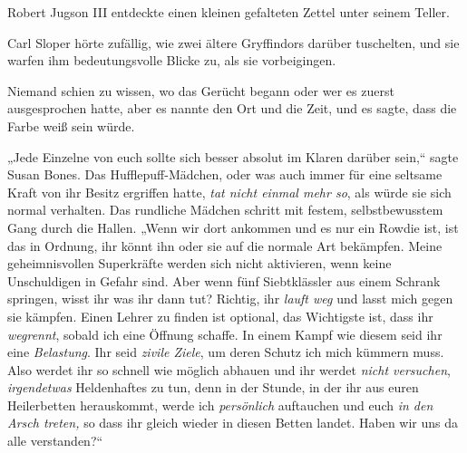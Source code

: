 Robert Jugson III entdeckte einen kleinen gefalteten Zettel unter seinem Teller.

Carl Sloper hörte zufällig, wie zwei ältere Gryffindors darüber tuschelten, und sie warfen ihm bedeutungsvolle Blicke zu, als sie vorbeigingen.

Niemand schien zu wissen, wo das Gerücht begann oder wer es zuerst ausgesprochen hatte, aber es nannte den Ort und die Zeit, und es sagte, dass die Farbe weiß sein würde.

\later

„Jede Einzelne von euch sollte sich besser absolut im Klaren darüber sein,“ sagte Susan Bones. Das Hufflepuff-Mädchen, oder was auch immer für eine seltsame Kraft von ihr Besitz ergriffen hatte, \emph{tat nicht einmal mehr so}, als würde sie sich normal verhalten. Das rundliche Mädchen schritt mit festem, selbstbewusstem Gang durch die Hallen. „Wenn wir dort ankommen und es nur ein Rowdie ist, ist das in Ordnung, ihr könnt ihn oder sie auf die normale Art bekämpfen. Meine geheimnisvollen Superkräfte werden sich nicht aktivieren, wenn keine Unschuldigen in Gefahr sind. Aber wenn fünf Siebtklässler aus einem Schrank springen, wisst ihr was ihr dann tut? Richtig, ihr \emph{lauft weg} und lasst mich gegen sie kämpfen. Einen Lehrer zu finden ist optional, das Wichtigste ist, dass ihr \emph{wegrennt}, sobald ich eine Öffnung schaffe. In einem Kampf wie diesem seid ihr eine \emph{Belastung}. Ihr seid \emph{zivile Ziele}, um deren Schutz ich mich kümmern muss. Also werdet ihr so schnell wie möglich abhauen und ihr werdet \emph{nicht versuchen}, \emph{irgendetwas} Heldenhaftes zu tun, denn in der Stunde, in der ihr aus euren Heilerbetten herauskommt, werde ich \emph{persönlich} auftauchen und euch \emph{in den Arsch treten,} so dass ihr gleich wieder in diesen Betten landet. Haben wir uns da alle verstanden?“

